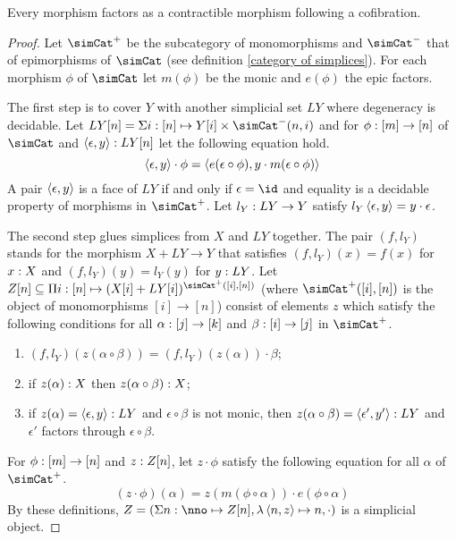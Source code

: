 \documentclass[csh.tex]{subfiles}
\begin{document}
\begin{proposition} Every morphism factors as a contractible morphism following a cofibration. \label{factor1} \end{proposition}

\begin{proof}  
Let $\simCat^+$ be the subcategory of monomorphisms and $\simCat^-$ that of epimorphisms of $\simCat$ (see definition \ref{category of simplices}). For each morphism $\phi$ of $\simCat$ let $m(\phi)$ be the monic and $e(\phi)$ the epic factors.

The first step is to cover $Y$ with another simplicial set $LY$ where degeneracy is decidable.
Let $LY[n] = \coproduct{i\of[n]}{Y[i]\times\simCat^-(n,i)}$ and for $\phi: [m]\to [n]$ of $\simCat$ and $\left\langle \epsilon,y \right\rangle: LY[n]$ let the following equation hold.
\[\left\langle \epsilon,y \right\rangle\cdot \phi=\left\langle e(\epsilon\circ \phi),y\cdot m(\epsilon\circ\phi) \right\rangle\]
A pair $\left\langle \epsilon,y \right\rangle$ is a face of $LY$ if and only if $\epsilon=\id$ and equality is a decidable property of morphisms in $\simCat^+$.
Let $l_Y: LY\to Y$ satisfy $l_Y\left\langle \epsilon,y \right\rangle=y\cdot\epsilon$.


The second step glues simplices from $X$ and $LY$ together.
The pair $(f,l_Y)$ stands for the morphism $X+LY\to Y$ that satisfies $(f,l_Y)(x)=f(x)$ for $x: X$ and $(f,l_Y)(y) = l_Y(y)$ for $y: LY$.
Let $Z[n]\subseteq \product{i\of[n]}{(X[i]+LY[i])^{\simCat^+([i],[n])}}$ (where $\simCat^+([i],[n])$ is the object of monomorphisms $[i]\to [n]$) consist of elements $z$ which satisfy the following conditions for all $\alpha: [j]\to [k]$ and $\beta: [i]\to[j]$ in $\simCat^+$.
\begin{enumerate}
\item $(f,l_Y)(z(\alpha\circ\beta)) = (f,l_Y)(z(\alpha))\cdot\beta$;
\item if $z(\alpha): X$ then $z(\alpha\circ\beta): X$;
\item if $z(\alpha)=\left\langle \epsilon,y \right\rangle: LY$ and $\epsilon\circ\beta$ is not monic, then $z(\alpha\circ\beta) = \left\langle \epsilon',y' \right\rangle: LY$ and $\epsilon'$ factors through $\epsilon\circ\beta$.
\end{enumerate}
For $\phi:[m]\to [n]$ and $z: Z[n]$, let $z\cdot\phi$ satisfy the following equation for all $\alpha$ of $\simCat^+$.
\[ (z\cdot\phi)(\alpha) = z(m(\phi\circ\alpha))\cdot e(\phi\circ \alpha) \]
By these definitions, $Z=(\coproduct{n\of\nno}{Z[n]},\function{\tuplet{n,z}}n,\cdot)$ is a simplicial object.


\end{proof}
\end{document}
